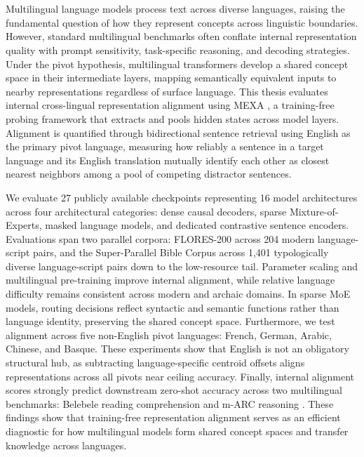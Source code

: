 \chapter{\abstractname}

Multilingual language models process text across diverse languages, raising the fundamental question of how they represent concepts across linguistic boundaries. However, standard multilingual benchmarks often conflate internal representation quality with prompt sensitivity, task-specific reasoning, and decoding strategies. Under the pivot hypothesis, multilingual transformers develop a shared concept space in their intermediate layers, mapping semantically equivalent inputs to nearby representations regardless of surface language. This thesis evaluates internal cross-lingual representation alignment using MEXA \citep{kargaran2025mexa}, a training-free probing framework that extracts and pools hidden states across model layers. Alignment is quantified through bidirectional sentence retrieval using English as the primary pivot language, measuring how reliably a sentence in a target language and its English translation mutually identify each other as closest nearest neighbors among a pool of competing distractor sentences.

We evaluate 27 publicly available checkpoints representing 16 model architectures across four architectural categories: dense causal decoders, sparse Mixture-of-Experts, masked language models, and dedicated contrastive sentence encoders. Evaluations span two parallel corpora: FLORES-200 \citep{nllbteam2022} across 204 modern language-script pairs, and the Super-Parallel Bible Corpus \citep{mayer2014bible} across 1,401 typologically diverse language-script pairs down to the low-resource tail. Parameter scaling and multilingual pre-training improve internal alignment, while relative language difficulty remains consistent across modern and archaic domains. In sparse MoE models, routing decisions reflect syntactic and semantic functions rather than language identity, preserving the shared concept space. Furthermore, we test alignment across five non-English pivot languages: French, German, Arabic, Chinese, and Basque. These experiments show that English is not an obligatory structural hub, as subtracting language-specific centroid offsets aligns representations across all pivots near ceiling accuracy. Finally, internal alignment scores strongly predict downstream zero-shot accuracy across two multilingual benchmarks: Belebele reading comprehension \citep{bandarkar2024belebele} and m-ARC reasoning \citep{lai2023okapi}. These findings show that training-free representation alignment serves as an efficient diagnostic for how multilingual models form shared concept spaces and transfer knowledge across languages.
